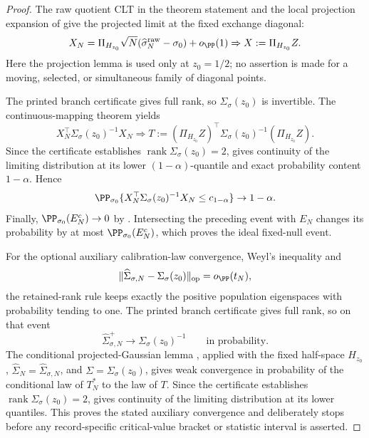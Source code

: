 \begin{proof}
The raw quotient CLT in the theorem statement and the local projection
expansion of  give the
projected limit at the fixed exchange diagonal:
\[
X_N
=\Pi_{H_{z_0}}\sqrt N(\widehat\sigma_N^{\rm raw}-\sigma_0)+o_{\PP}(1)
\Rightarrow
X:=\Pi_{H_{z_0}}Z .
\]
Here the projection lemma is used only at \(z_0=1/2\); no assertion is made for
a moving, selected, or simultaneous family of diagonal points.

The printed branch certificate gives full rank, so
\(\Sigma_\sigma(z_0)\) is invertible.  The continuous-mapping theorem yields
\[
X_N^\top\Sigma_\sigma(z_0)^{-1}X_N\Rightarrow
T:=(\Pi_{H_{z_0}}Z)^\top
\Sigma_\sigma(z_0)^{-1}(\Pi_{H_{z_0}}Z).
\]
Since the certificate establishes \(\operatorname{rank}\Sigma_\sigma(z_0)=2\),
 gives continuity of
the limiting distribution at its lower \((1-\alpha)\)-quantile and exact
probability content \(1-\alpha\).  Hence
\[
\PP_{\sigma_0}\{
X_N^\top\Sigma_\sigma(z_0)^{-1}X_N\le c_{1-\alpha}\}\to1-\alpha .
\]
Finally, \(\PP_{\sigma_0}(E_N^c)\to0\) by
.  Intersecting the preceding
event with \(E_N\) changes its probability by at most \(\PP_{\sigma_0}(E_N^c)\),
which proves the ideal fixed-null event.

For the optional auxiliary calibration-law convergence, Weyl's inequality and
\[
\|\widehat\Sigma_{\sigma,N}-\Sigma_\sigma(z_0)\|_{\operatorname{op}}
=o_{\PP}(t_N),
\]
the retained-rank rule keeps exactly the positive population eigenspaces with
probability tending to one.  The printed branch certificate gives full rank,
so on that event
\[
\widehat\Sigma_{\sigma,N}^{+}\to \Sigma_\sigma(z_0)^{-1}
\qquad\text{in probability}.
\]
The conditional projected-Gaussian lemma
, applied with the
fixed half-space \(H_{z_0}\), \(\widehat\Sigma_N=\widehat\Sigma_{\sigma,N}\),
and \(\Sigma=\Sigma_\sigma(z_0)\), gives weak convergence in probability of
the conditional law of \(T_N^\ast\) to the law of \(T\).  Since the certificate
establishes \(\operatorname{rank}\Sigma_\sigma(z_0)=2\),
 gives continuity of
the limiting distribution at its lower quantiles.  This proves the stated
auxiliary convergence and deliberately stops before any record-specific
critical-value bracket or statistic interval is asserted.
\end{proof}

